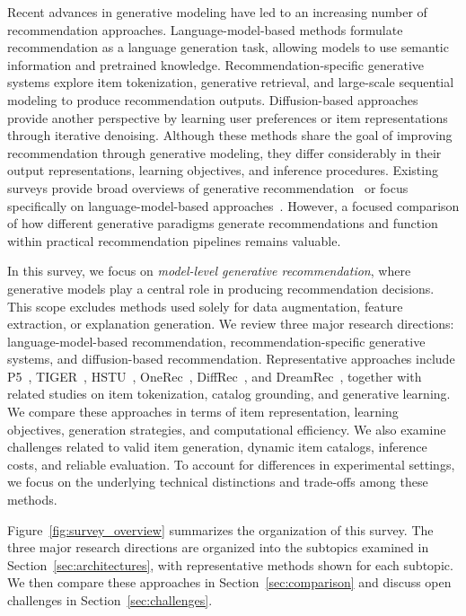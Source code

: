 \documentclass[sigconf,nonacm]{acmart}
\begin{document}
Recent advances in generative modeling have led to an increasing number of recommendation approaches. Language-model-based methods formulate recommendation as a language generation task, allowing models to use semantic information and pretrained knowledge. Recommendation-specific generative systems explore item tokenization, generative retrieval, and large-scale sequential modeling to produce recommendation outputs. Diffusion-based approaches provide another perspective by learning user preferences or item representations through iterative denoising. Although these methods share the goal of improving recommendation through generative modeling, they differ considerably in their output representations, learning objectives, and inference procedures. Existing surveys provide broad overviews of generative recommendation~\cite{survey,survey2026} or focus specifically on language-model-based approaches~\cite{llmsurvey}. However, a focused comparison of how different generative paradigms generate recommendations and function within practical recommendation pipelines remains valuable.

In this survey, we focus on \emph{model-level generative recommendation}, where generative models play a central role in producing recommendation decisions. This scope excludes methods used solely for data augmentation, feature extraction, or explanation generation. We review three major research directions: language-model-based recommendation, recommendation-specific generative systems, and diffusion-based recommendation. Representative approaches include P5~\cite{p5}, TIGER~\cite{tiger}, HSTU~\cite{hstu}, OneRec~\cite{onerec}, DiffRec~\cite{diffrec}, and DreamRec~\cite{dreamrec}, together with related studies on item tokenization, catalog grounding, and generative learning. We compare these approaches in terms of item representation, learning objectives, generation strategies, and computational efficiency. We also examine challenges related to valid item generation, dynamic item catalogs, inference costs, and reliable evaluation. To account for differences in experimental settings, we focus on the underlying technical distinctions and trade-offs among these methods.

Figure~\ref{fig:survey_overview} summarizes the organization of this survey. The three major research directions are organized into the subtopics examined in Section~\ref{sec:architectures}, with representative methods shown for each subtopic. We then compare these approaches in Section~\ref{sec:comparison} and discuss open challenges in Section~\ref{sec:challenges}.
\end{document}
